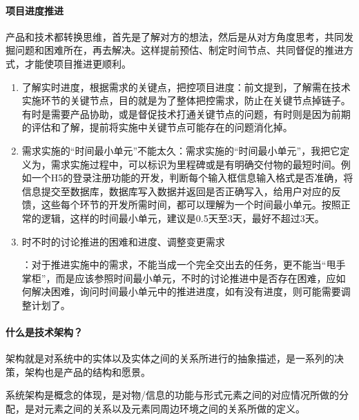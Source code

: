 \documentclass[letterpaper,10pt,english]{sphinxmanual}
\begin{document}
\paragraph{项目进度推进}
\label{\detokenize{chapter_idea/understand_tech:id13}}
产品和技术都转换思维，首先是了解对方的想法，然后是从对方角度思考，共同发掘问题和困难所在，再去解决。这样提前预估、制定时间节点、共同督促的推进方式，才能使项目推进更顺利。
\begin{enumerate}
%
\item {} 
了解实时进度，根据需求的关键点，把控项目进度：前文提到，了解需在技术实施环节的关键节点，目的就是为了整体把控需求，防止在关键节点掉链子。有时是需要产品协助，或是督促技术打通关键节点的问题，有时则是因为前期的评估和了解，提前将实施中关键节点可能存在的问题消化掉。

\item {} 
需求实施的“时间最小单元”不能太久：需求实施的“时间最小单元”，我把它定义为，需求实施过程中，可以标识为里程碑或是有明确交付物的最短时间。例如一个H5的登录注册功能的开发，判断每个输入框信息输入格式是否准确，将信息提交至数据库，数据库写入数据并返回是否正确写入，给用户对应的反馈，这些每个环节的开发所需时间，都可以理解为一个时间最小单元。按照正常的逻辑，这样的时间最小单元，建议是0.5天至3天，最好不超过3天。

\item {} 
时不时的讨论推进的困难和进度、调整变更需求%
\begin{footnote}[438]\sphinxAtStartFootnote
{}
%
\end{footnote}：对于推进实施中的需求，不能当成一个完全交出去的任务，更不能当“甩手掌柜”，而是应该参照时间最小单元，不时的讨论推进中是否存在困难，应如何解决困难，询问时间最小单元中的推进进度，如有没有进度，则可能需要调整计划了。

\end{enumerate}


\paragraph{什么是技术架构？}
\label{\detokenize{chapter_idea/understand_tech:id14}}
架构就是对系统中的实体以及实体之间的关系所进行的抽象描述，是一系列的决策，架构也是产品的结构和愿景。

系统架构是概念的体现，是对物/信息的功能与形式元素之间的对应情况所做的分配，是对元素之间的关系以及元素同周边环境之间的关系所做的定义。
\end{document}
